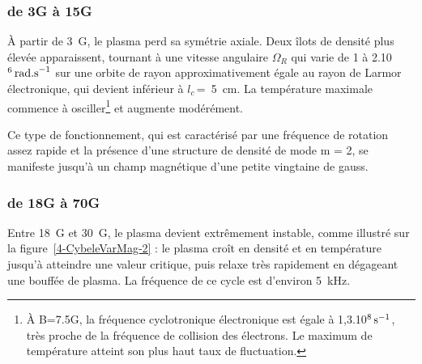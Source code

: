 \begin{refsection}
\subsubsection{de 3G à 15G}
À partir de 3~G, le plasma perd sa symétrie axiale. Deux îlots de densité plus
élevée apparaissent, tournant à une vitesse angulaire $\Omega_R$ qui varie de 1
à 2.10$^{{6}}\,\text{rad.s}^{{-1}}$ sur une orbite de rayon
approximativement égale au rayon de Larmor électronique, qui devient inférieur
à $l_c\,$=~5~cm. La température maximale commence à osciller\footnote{À B=7.5G,
la fréquence cyclotronique électronique est égale à
1,3.10$^{{8}}\,\text{s}^{{-1}}$, très proche de la fréquence de
collision des électrons. Le maximum de température atteint son plus haut taux
de fluctuation.} et augmente modérément.

Ce type de fonctionnement, qui est caractérisé par une
fréquence de rotation assez rapide et la présence d'une structure de densité de
mode m = 2, se manifeste jusqu'à un champ magnétique d'une petite vingtaine de
gauss. 


\subsubsection{de 18G à 70G}
Entre 18~G et 30~G, le plasma devient extrêmement instable, comme illustré
sur la figure~\ref{4-CybeleVarMag-2} : le plasma croît en
densité et en température jusqu'à atteindre une valeur critique, puis relaxe
très rapidement en dégageant une bouffée de plasma. La fréquence de ce cycle
est d'environ 5~kHz.


\end{refsection}
